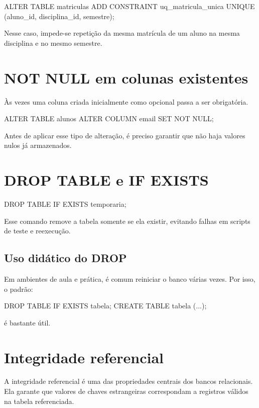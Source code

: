 \begin{sqlcode}
ALTER TABLE matriculas
ADD CONSTRAINT uq_matricula_unica
UNIQUE (aluno_id, disciplina_id, semestre);
\end{sqlcode}

Nesse caso, impede-se repetição da mesma matrícula de um aluno na mesma disciplina e no mesmo semestre.

\section{NOT NULL em colunas existentes}

Às vezes uma coluna criada inicialmente como opcional passa a ser obrigatória.

\begin{sqlcode}
ALTER TABLE alunos
ALTER COLUMN email SET NOT NULL;
\end{sqlcode}

Antes de aplicar esse tipo de alteração, é preciso garantir que não haja valores nulos já armazenados.

\section{DROP TABLE e IF EXISTS}

\begin{sqlcode}
DROP TABLE IF EXISTS temporaria;
\end{sqlcode}

Esse comando remove a tabela somente se ela existir, evitando falhas em scripts de teste e reexecução.

\subsection{Uso didático do DROP}

Em ambientes de aula e prática, é comum reiniciar o banco várias vezes. Por isso, o padrão:

\begin{sqlcode}
DROP TABLE IF EXISTS tabela;
CREATE TABLE tabela (...);
\end{sqlcode}

é bastante útil.

\section{Integridade referencial}

A integridade referencial é uma das propriedades centrais dos bancos relacionais. Ela garante que valores de chaves estrangeiras correspondam a registros válidos na tabela referenciada.

